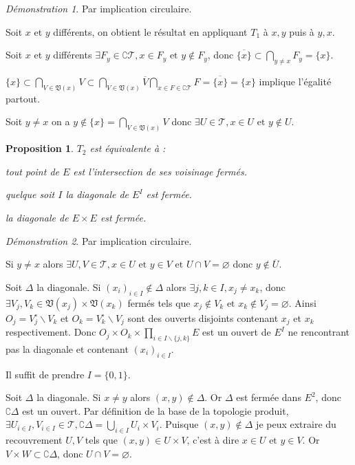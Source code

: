 \documentclass[a4paper, 11pt, french]{book}
\newenvironment{itemise}{\itemize}{\enditemize}
\theoremstyle{plain} %
\newtheorem{proposition}{Proposition}
\theoremstyle{definition} %
\theoremstyle{remark} %
\newtheorem*{demonstration}{Démonstration}
\renewcommand{\setminus}{\backslash}
\newcommand{\1}{\mathds{1}}
\newcommand\vide{\varnothing}
\newcommand\et{\text{ et }}
\begin{document}
\begin{demonstration}
	Par implication circulaire.
	\begin{itemise}
		\item Soit $x$ et $y$ différents, on obtient le résultat en appliquant $T_1$ à $x, y$ puis à $y, x$.
		\item Soit $x$ et $y$ différents $\exists F_y\in\complement\mathscr{T}, x\in F_y\et y\notin F_y$, donc $\overline{\{x\}}\subset\bigcap_{y\neq x}F_y=\{x\}$.
		\item $\{x\}\subset\bigcap_{V\in\mathfrak{V}(x)}V\subset\bigcap_{V\in\mathfrak{V}(x)}\overline{V}\bigcap_{x\in F\in\complement\mathscr{T}}F=\overline{\{x\}}=\{x\}$ implique l'égalité partout.
		\item Soit $y\neq x$ on a $y\notin\{x\}=\bigcap_{V\in\mathfrak{V}(x)}V$ donc $\exists U\in\mathscr{T}, x\in U\et y\notin U$.
	\end{itemise}
\end{demonstration}

\begin{proposition}
	$T_2$ est équivalente à :
	\begin{itemise}
		\item tout point de $E$ est l'intersection de ses voisinage fermés.
		\item quelque soit $I$ la diagonale de $E^I$ est fermée.
		\item la diagonale de $E\times E$ est fermée.
	\end{itemise}
\end{proposition}

\begin{demonstration}
	Par implication circulaire.
	\begin{itemise}
		\item Si $y\neq x$ alors $\exists U, V\in\mathscr{T}, x\in U\et y\in V\et U\cap V=\vide$ donc $y\notin\overline{U}$.
		\item Soit $\Delta$ la diagonale.
		Si $(x_i)_{i\in I}\notin\Delta$ alors $\exists j, k\in I, x_j\neq x_k$, donc $\exists V_j, V_k\in\mathfrak{V}(x_j)\times\mathfrak{V}(x_k)$ fermés tels que $x_j\notin V_k\et x_k\notin V_j=\vide$.
		Ainsi $O_j=V_j^\circ\setminus V_k$ et $O_k=V_k^\circ\setminus V_j$ sont des ouverts disjoints contenant $x_j$ et $x_k$ respectivement.
		Donc $O_j\times O_k\times\prod_{i\in I\setminus\{j, k\}}E$ est un ouvert de $E^I$ ne rencontrant pas la diagonale et contenant $(x_i)_{i\in I}$.
		\item Il suffit de prendre $I=\{0, 1\}$.
		\item Soit $\Delta$ la diagonale.
		Si $x\neq y$ alors $(x, y)\notin\Delta$.
		Or $\Delta$ est fermée dans $E^2$, donc $\complement\Delta$ est un ouvert.
		Par définition de la base de la topologie produit, $\exists U_{i\in I}, V_{i\in I}\in\mathscr{T}, \complement\Delta=\bigcup_{i\in I} U_i\times V_i$.
		Puisque $(x, y)\notin\Delta$ je peux extraire du recouvrement $U, V$ tels que $(x, y)\in U\times V$, c'est à dire $x\in U\et y\in V$.
		Or $V\times W\subset\complement\Delta$, donc $U\cap V=\vide$.
	\end{itemise}
\end{demonstration}
\end{document}
